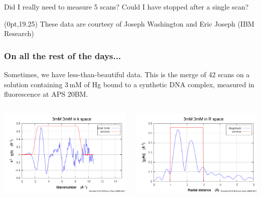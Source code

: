 \documentclass[10pt, xcolor=x11names, compress]{beamer}
\begin{document}
\begin{frame}
  ~\\[-7ex]
  ~

  \begin{exampleblock}{}
    \begin{center}
      Did I really need to measure 5 scans?  Could I have stopped
      after a single scan?
    \end{center}
  \end{exampleblock}
  \begin{textblock*}{0.4\linewidth}(0pt,19.25\TPVertModule)%
    \tiny%
    These data are courtesy of Joseph Washington and Eric
    Joseph (IBM Research)
  \end{textblock*}
\end{frame}

\begin{frame}
  \frametitle{On all the rest of the days...}
  \small
  Sometimes, we have less-than-beautiful data.  This is the merge of 42
  scans on a solution containing 3\,mM of Hg bound to a synthetic DNA
  complex, measured in fluorescence at APS 20BM.
  \begin{columns}
    \begin{column}{0.5\linewidth}
      \begin{center}
        \includegraphics[width=0.8\linewidth]{../ATEA/info/hgdna_chik.png}
      \end{center}
    \end{column}
    \begin{column}{0.5\linewidth}
      \begin{center}
        \includegraphics[width=0.8\linewidth]{../ATEA/info/hgdna_chir.png}

\end{center}
\end{column}
\end{columns}
\end{frame}
\end{document}
